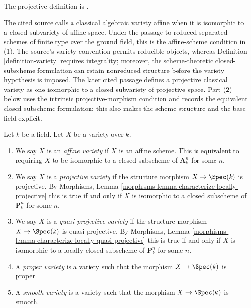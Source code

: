 \begin{definition}
\label{definition-variety-type}
\begin{reference}
\cite[Chapter II, \S 3, no. 42, pp. 233--234]{FAC}
The projective definition is
\cite[Chapter III, \S 1, no. 51, p. 244]{FAC}.
\end{reference}
\begin{history}
The cited source calls a classical algebraic variety affine when it is
isomorphic to a closed subvariety of affine space. Under the passage to
reduced separated schemes of finite type over the ground field, this is the
affine-scheme condition in (1). The source's variety convention permits
reducible objects, whereas Definition \ref{definition-variety} requires
integrality; moreover, the scheme-theoretic closed-subscheme formulation can
retain nonreduced structure before the variety hypothesis is imposed.
The later cited passage defines a projective classical variety as one
isomorphic to a closed subvariety of projective space. Part (2) below uses
the intrinsic projective-morphism condition and records the equivalent
closed-subscheme formulation; this also makes the scheme structure and the
base field explicit.
\end{history}
Let $k$ be a field. Let $X$ be a variety over $k$.
\begin{enumerate}
\item We say $X$ is an {\it affine variety} if $X$ is an affine scheme.
This is equivalent to requiring $X$ to be isomorphic to a closed
subscheme of $\mathbf{A}^n_k$ for some $n$.
\item We say $X$ is a {\it projective variety} if the
structure morphism $X \to \Spec(k)$ is projective. By
Morphisms, Lemma \ref{morphisms-lemma-characterize-locally-projective}
this is true if and only if $X$ is isomorphic to a closed
subscheme of $\mathbf{P}^n_k$ for some $n$.
\item We say $X$ is a {\it quasi-projective variety} if
the structure morphism $X \to \Spec(k)$ is quasi-projective. By
Morphisms, Lemma \ref{morphisms-lemma-characterize-locally-quasi-projective}
this is true if and only if $X$ is isomorphic to a
locally closed subscheme of $\mathbf{P}^n_k$ for some $n$.
\item A {\it proper variety} is a variety such that the
morphism $X \to \Spec(k)$ is proper.
\item A {\it smooth variety} is a variety such that the
morphism $X \to \Spec(k)$ is smooth.
\end{enumerate}
\end{definition}

